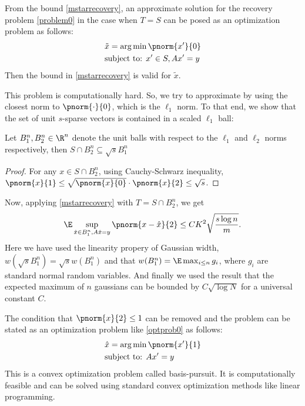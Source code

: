 From the bound \eqref{mstarrecovery}, an approximate solution for the recovery problem
\eqref{problem0} in the case when $T = S$
can be posed as an optimization problem as follows:
\begin{equation}\label{optprob0}
	\begin{split}
		&\tilde{x} = \arg\min\pnorm{x'}{0}\\
		&\text{subject to: } x'\in S,  Ax' = y
	\end{split}
\end{equation}
Then the bound in \eqref{mstarrecovery} is valid for $\tilde{x}$.

This problem is computationally hard. So, we try to approximate
by using the closest norm to $\pnorm{\cdot}{0}$, which is the $\ell_1$ norm.
To that end, we show that the set of unit $s$-sparse vectors is contained
in a scaled $\ell_1$ ball:
\begin{proposition}\label{inclusiontheorem}
	Let $B_1^n, B_2^n\in \R^n$ denote the unit balls
	with respect to the $\ell_1$ and $\ell_2$ norms respectively, then
	$S\cap B_2^n \subseteq \sqrt{s} B_1^n$
\end{proposition}

\begin{proof}
	For any $x\in S\cap B_2^n$, using Cauchy-Schwarz inequality,
	$\pnorm{x}{1}\leq \sqrt{\pnorm{x}{0}}\cdot \pnorm{x}{2}\leq \sqrt{s}$.
\end{proof}
Now, applying \eqref{mstarrecovery} with $T = S\cap B_2^n$, we get
\begin{equation}\label{scaledl1ball}
	\E\sup_{\hat{x}\in B_1^n, A\hat{x}=y}\pnorm{x-\hat{x}}{2}\leq CK^2\sqrt{\frac{s\log n}{m}}.
\end{equation}
Here we have used the linearity propery of Gaussian width, $w(\sqrt{s}B_1^n)=\sqrt{s}w(B_1^n)$
and that $w(B_1^n) = \E\max_{i\leq n} g_i$, where $g_i$ are standard normal random variables.
And finally we used the result that the expected maximum of $n$ gaussians can be
bounded by $C\sqrt{\log N}$ for a universal constant $C$.

The condition that $\pnorm{x}{2}\leq 1$ can be removed and the problem can be stated as
 an optimization problem like \eqref{optprob0} as follows:
 \begin{equation}\label{basispursuit}
	 \begin{split}
		 &\hat{x} = \arg\min\pnorm{x'}{1}\\
		 &\text{subject to: } Ax' = y
	 \end{split}
 \end{equation}
 This is a convex optimization problem called basis-pursuit.
 It is computationally feasible and can be solved using standard
 convex optimization methods like linear programming.

